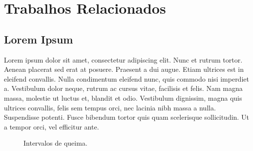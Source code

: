 \chapter{Trabalhos Relacionados}
\label{chap2}

\section{Lorem Ipsum}

Lorem ipsum dolor sit amet, consectetur adipiscing elit. Nunc et rutrum tortor. Aenean placerat sed erat at posuere. Praesent a dui augue. Etiam ultrices est in eleifend convallis. Nulla condimentum eleifend nunc, quis commodo nisi imperdiet a. Vestibulum dolor neque, rutrum ac cursus vitae, facilisis et felis. Nam magna massa, molestie ut luctus et, blandit et odio. Vestibulum dignissim, magna quis ultrices convallis, felis sem tempus orci, nec lacinia nibh massa a nulla. Suspendisse potenti. Fusce bibendum tortor quis quam scelerisque sollicitudin. Ut a tempor orci, vel efficitur ante.

\begin{figure}[H]
  \centering
  \label{chap2:timeline}
  \caption{Intervalos de queima.}  
  \end{figure}

